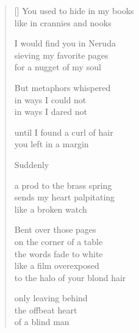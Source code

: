 \documentclass[12pt,a4paper]{article}
\begin{document}
\bigskip

\begin{verse}[\versewidth]
  You used to hide in my books \\
  like in crannies and nooks

  I would find you in Neruda \\
  sieving my favorite pages \\
  for a nugget of my soul

  But metaphors whispered \\
  in ways I could not \\
  in ways I dared not

  until I found a curl of hair \\
  you left in a margin

  Suddenly

  a prod to the brass spring \\
  sends my heart palpitating \\
  like a broken watch

  Bent over those pages \\
  on the corner of a table \\
  the words fade to white \\
  like a film overexposed \\
  to the halo of your blond hair

  only leaving behind \\
  the offbeat heart \\
  of a blind man
\end{verse}


\newpage

\poemtitle{}

\settowidth{\versewidth}{on your body of soft amber}

\bigskip
\end{document}
